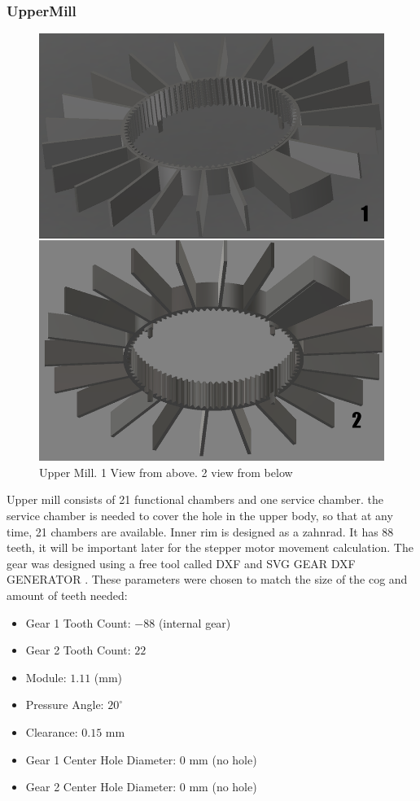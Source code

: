 \subsubsection{UpperMill}
\begin{figure}[h]
	\centering
	\includegraphics[width=0.6\linewidth]{Figures/Uppermill}
	\caption[Upper Mill]{Upper Mill. 1 View from above. 2 view from below}
	\label{fig:uppermill}
\end{figure}
Upper mill consists of 21 functional chambers and one service chamber. the service chamber is needed to cover the hole in the upper body, so that at any time, 21 chambers are available. Inner rim is designed as a  zahnrad. It has 88 teeth, it will be important later for the stepper motor movement calculation. The gear was designed using a free tool called DXF and SVG GEAR DXF GENERATOR \cite{evolvent_spur_gear_generator}.
These parameters were chosen to match the size of the cog and amount of teeth needed: 
\begin{itemize}
	\item Gear 1 Tooth Count: $-88$ (internal gear)
	\item Gear 2 Tooth Count: $22$
	\item Module: $1.11$ (mm)
	\item Pressure Angle: $20^\circ$
	\item Clearance: $0.15$ mm
	\item Gear 1 Center Hole Diameter: $0$ mm (no hole)
	\item Gear 2 Center Hole Diameter: $0$ mm (no hole)
\end{itemize}

